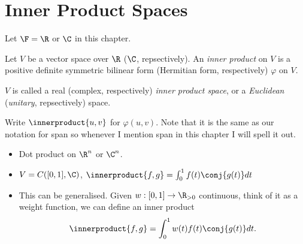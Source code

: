 \documentclass[a4paper]{article}
\newcommand*{\ip}{\innerproduct}
\theoremstyle{definition}
\begin{document}
\section{Inner Product Spaces}

Let \(\F = \R\) or \(\C\) in this chapter.

\begin{definition}
  Let \(V\) be a vector space over \(\R\) (\(\C\), repsectively). An \emph{inner product} on \(V\) is a positive definite symmetric bilinear form (Hermitian form, respectively) \(\varphi\) on \(V\).

  \(V\) is called a real (complex, respectively) \emph{inner product space}, or a \emph{Euclidean} (\emph{unitary}, repsectively) space.
\end{definition}

\begin{notation}
  Write \(\ip{u, v}\) for \(\varphi(u, v)\). Note that it is the same as our notation for span so whenever I mention span in this chapter I will spell it out.
\end{notation}

\begin{eg}\leavevmode
  \begin{itemize}
  \item Dot product on \(\R^n\) or \(\C^n\).
  \item \(V = C([0, 1], \C)\), \(\ip{f, g} = \int_0^1 f(t) \conj{g(t)} dt\)
  \item This can be generalised. Given \(w: [0, 1] \to \R_{> 0}\) continuous, think of it as a weight function, we can define an inner product
    \[
      \ip{f, g} = \int_{0}^{1} w(t)f(t)\conj{g(t)} dt.
    \]
  \end{itemize}
\end{eg}
\printindex
\end{document}
